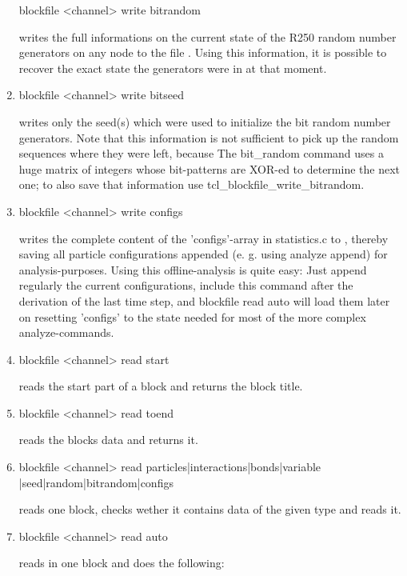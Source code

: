 \begin{enumerate}
\begin{code}
blockfile <channel> write bitrandom
\end{code}
writes the full informations on the current state of the R250 random
number generators on any node to the file . Using this
information, it is possible to recover the exact state the generators
were in at that moment.
 \item
\begin{code}
blockfile <channel> write bitseed
\end{code}
writes only the seed(s) which were used to initialize the bit random
number generators. Note that this information is not sufficient to
pick up the random sequences where they were left, because The
bit\_random command uses a huge matrix of integers whose bit-patterns
are XOR-ed to determine the next one; to also save that information
use tcl\_blockfile\_write\_bitrandom.
 \item
\begin{code}
blockfile <channel> write configs
\end{code}
writes the complete content of the 'configs'-array in statistics.c to
, thereby saving all particle configurations appended (e.
g. using analyze append) for analysis-purposes.  Using this
offline-analysis is quite easy: Just append regularly the current
configurations, include this command after the derivation of the last
time step, and blockfile read auto will load them later on resetting
'configs' to the state needed for most of the more complex
analyze-commands.
 \item
\begin{code}
blockfile <channel> read start 
\end{code}
  reads the start part of a block and returns the block title.
 \item
\begin{code}
blockfile <channel> read toend 
\end{code}
  reads the blocks data and returns it.
 \item
\begin{code}
blockfile <channel> read particles|interactions|bonds|variable
 |seed|random|bitrandom|configs
\end{code}
reads one block, checks wether it contains data of the given type and
reads it.
 \item
\begin{code}
blockfile <channel> read auto 
\end{code}
  reads in one block and does the following:

\end{enumerate}
